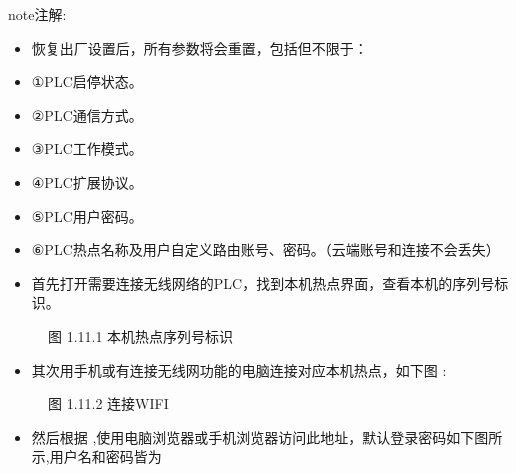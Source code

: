\documentclass[a4paper,10pt,english]{sphinxmanual}
\begin{document}
\begin{sphinxadmonition}{note}{注解:}\begin{itemize}
\item {} 
\sphinxAtStartPar
恢复出厂设置后，所有参数将会重置，包括但不限于：

\item {} 
\sphinxAtStartPar
①PLC启停状态。

\item {} 
\sphinxAtStartPar
②PLC通信方式。

\item {} 
\sphinxAtStartPar
③PLC工作模式。

\item {} 
\sphinxAtStartPar
④PLC扩展协议。

\item {} 
\sphinxAtStartPar
⑤PLC用户密码。

\item {} 
\sphinxAtStartPar
⑥PLC热点名称及用户自定义路由账号、密码。（云端账号和连接不会丢失）

\end{itemize}
\end{sphinxadmonition}

\sphinxAtStartPar
{}
\begin{itemize}
\item {} 
\sphinxAtStartPar
首先打开需要连接无线网络的PLC，找到本机热点界面，查看本机的序列号标识。

\end{itemize}

\begin{figure}[htbp]
\centering
\capstart

\noindent{}
\caption{图 1.11.1 本机热点序列号标识}\label{\detokenize{operation_guide:id25}}\end{figure}
\begin{itemize}
\item {} 
\sphinxAtStartPar
其次用手机或有连接无线网功能的电脑连接对应本机热点，如下图 :

\end{itemize}

\begin{figure}[htbp]
\centering
\capstart

\noindent{}
\caption{图 1.11.2 连接WIFI}\label{\detokenize{operation_guide:id26}}\end{figure}
\begin{itemize}
\item {} 
\sphinxAtStartPar
然后根据  ,使用电脑浏览器或手机浏览器访问此地址，默认登录密码如下图所示,用户名和密码皆为 

\end{itemize}
\end{document}
